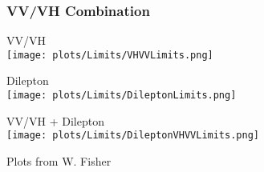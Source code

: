 \begin{frame}
	\frametitle{VV/VH Combination}
	
	
	
	\begin{center}
		VV/VH\\
		\texttt{[image: plots/Limits/VHVVLimits.png]}
	\end{center}
	
	
	
	\begin{center}
		Dilepton\\
		\texttt{[image: plots/Limits/DileptonLimits.png]}
	\end{center}
	
	
	
	\begin{center}
		VV/VH + Dilepton\\
		\texttt{[image: plots/Limits/DileptonVHVVLimits.png]}
	\end{center}
	
	\cend
	
	Plots from W. Fisher
	
\end{frame}